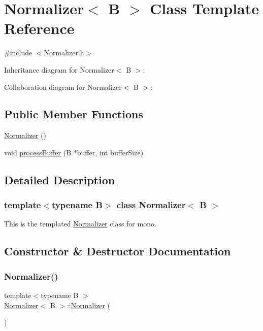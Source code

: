 \hypertarget{classNormalizer}{}\section{Normalizer$<$ B $>$ Class Template Reference}
\label{classNormalizer}


{\ttfamily \#include $<$Normalizer.\+h$>$}



Inheritance diagram for Normalizer$<$ B $>$\+:


Collaboration diagram for Normalizer$<$ B $>$\+:
\subsection*{Public Member Functions}
\begin{DoxyCompactItemize}
\item 
\hyperlink{classNormalizer_ac4a2efbfed923f26864bd3b67918f76a}{Normalizer} ()
\item 
void \hyperlink{classNormalizer_a30a5a6459facb09f5dc2c7c0a0c335c8}{process\+Buffer} (B $\ast$buffer, int buffer\+Size)
\end{DoxyCompactItemize}


\subsection{Detailed Description}
\subsubsection*{template$<$typename B$>$\newline
class Normalizer$<$ B $>$}

This is the templated \hyperlink{classNormalizer}{Normalizer} class for mono. 

\subsection{Constructor \& Destructor Documentation}
\mbox{\label{classNormalizer_ac4a2efbfed923f26864bd3b67918f76a}} 
\subsubsection{\texorpdfstring{Normalizer()}{Normalizer()}}
{\footnotesize\ttfamily template$<$typename B $>$ \\
\hyperlink{classNormalizer}{Normalizer}$<$ B $>$\+::\hyperlink{classNormalizer}{Normalizer} (\begin{DoxyParamCaption}{ }\end{DoxyParamCaption})}

